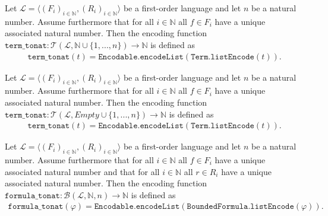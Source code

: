 \begin{definition}\label{def:FV-Term-Enc}
  \leanok
    Let $\mathcal{L} = \langle (F_i)_{i \in \mathbb{N}}, (R_i)_{i \in \mathbb{N}} \rangle$ be a first-order language and let $n$ be a natural number. Assume furthermore that for all $i \in \mathbb{N}$ all $f \in F_i$ have a unique associated natural number. Then the encoding function $\texttt{term\_tonat} : \mathcal{T}(\mathcal{L},\mathbb{N} \cup \{1,...,n\}) \to \mathbb{N}$ is defined as 
    \begin{align*}  
        \texttt{term\_tonat}(t) = \texttt{Encodable.encodeList}(\texttt{Term.listEncode}(t)).
    \end{align*}
\end{definition}

\begin{definition}\label{def:S-Term-Enc}
  \leanok
    Let $\mathcal{L} = \langle (F_i)_{i \in \mathbb{N}}, (R_i)_{i \in \mathbb{N}} \rangle$ be a first-order language and let $n$ be a natural number. Assume furthermore that for all $i \in \mathbb{N}$ all $f \in F_i$ have a unique associated natural number. Then the encoding function $\texttt{term\_tonat} : \mathcal{T}(\mathcal{L},Empty \cup \{1,...,n\}) \to \mathbb{N}$ is defined as 
    \begin{align*}  
        \texttt{term\_tonat}(t) = \texttt{Encodable.encodeList}(\texttt{Term.listEncode}(t)).
    \end{align*}
\end{definition}

\begin{definition}\label{def:FV-Formula-to-N}
  \leanok
    Let $\mathcal{L} = \langle (F_i)_{i \in \mathbb{N}}, (R_i)_{i \in \mathbb{N}} \rangle$ be a first-order language and let $n$ be a natural number. Assume furthermore that for all $i \in \mathbb{N}$ all $f \in F_i$ have a unique associated natural number and that for all $i \in \mathbb{N}$ all $r \in R_i$ have a unique associated natural number. Then the encoding function $\texttt{formula\_tonat} : \mathcal{B}(\mathcal{L},\mathbb{N},n) \to \mathbb{N}$ is defined as 
    \begin{align*}
        \texttt{formula\_tonat}(\varphi) = \texttt{Encodable.encodeList}(\texttt{BoundedFormula.listEncode}(\varphi)).
    \end{align*}
\end{definition}

